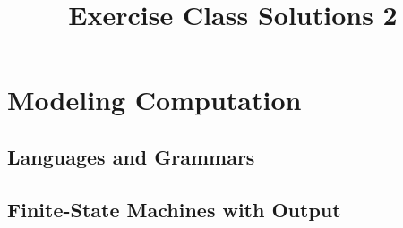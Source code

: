 \documentclass[11pt,a4paper]{article}
\newcommand{\chapter}[2]{%
\setcounter{section}{#1-1}%
\section{#2}%
}
\newcommand{\subchapter}[2]{%
\setcounter{subsection}{#1-1}%
\subsection{#2}%
}
\begin{document}
\title{Exercise Class Solutions 2}
\date{}
\author{}
\maketitle

\chapter{13}{Modeling Computation}
	\subchapter{1}{Languages and Grammars}
		
		\pagebreak
		
		
		\pagebreak
		
		
		\pagebreak
		
		\pagebreak
		
		\pagebreak
	\subchapter{2}{Finite-State Machines with Output}
		
		\pagebreak
		
		\pagebreak
		
		\pagebreak
\end{document}
